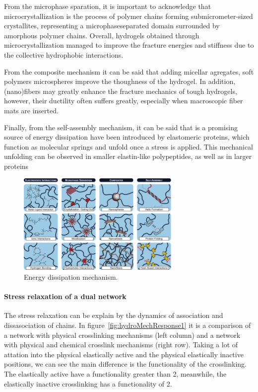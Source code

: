 From the microphase sparation, it is important to acknowledge that microcrystallization is the process of polymer chains forming submicrometer-sized crystallites, representing a microphaseseparated domain surrounded by amorphous polymer chains.
Overall, hydrogels obtained through microcrystallization managed to improve the fracture energies and stiffness due to the collective hydrophobic interactions. 

From the composite mechanism it can be said that adding micellar agregates, soft polymers microspheres improve the thoughness of the hydrogel.
In addition, (nano)fibers may greatly enhance the fracture mechanics of tough hydrogels, however, their ductility often suffers greatly, especially when macroscopic fiber mats are inserted.

Finally, from the self-assembly mechanism, it can be said that is a promising source of energy dissipation have been introduced by elastomeric proteins, which function as molecular springs and unfold once a stress is applied. 
This mechanical unfolding can be observed in smaller elastin-like polypeptides, as well as in larger proteins

\begin{figure}[ht!]
    \centering
    \includegraphics[width=0.7\textwidth]{figs/explainMechResponse/energyDissipationMechanisms.png
}
    \caption{Energy dissipation mechanism\citep{naritaViscoelasticPropertiesPolyvinyl2013}.}\label{fig:energyDissipation}
\end{figure}


\paragraph{Stress relaxation of a dual network}
The stress relaxation can be explain by the dynamics of association and dissasociation of chains\citep{naritaViscoelasticPropertiesPolyvinyl2013}.
In figure~\ref{fig:hydroMechResponse1} it is a comparison of a network with physical crosslinking mechanisms (left column) and a network with physical and chemical crosslink mechanisms (right row).
Taking a lot of attation into the physical elastically active and the physical elastically inactive positions, we can see the main difference is the functionality of the crosslinking.
The elastically active have a functionality greater than 2, meanwhile, the elastically inactive crosslinking has a functionality of 2. 

